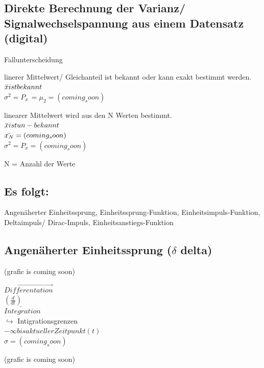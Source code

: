 \documentclass[a4paper]{article}
\begin{document}
\subsection*{Direkte Berechnung der Varianz/ Signalwechselspannung aus einem Datensatz (digital)}

\begin{center}
    Fallunterscheidung
\end{center}
\begin{multicols}{2}
    linerer Mittelwert/ Gleichanteil ist bekannt oder kann exakt bestimmt werden. \\
    $\Bar{x} ist bekannt$ \\
    $\sigma^2 = P_{x~} = \mu_2 = (coming_soon)$
    
    \columnbreak
    linearer Mittelwert wird aus den N Werten bestimmt. \\
    $\Bar{x} ist un-bekannt$ \\
    $\Bar{x_N} = (coming_soon)$ \\
    $\sigma^2 = P_x = (coming_soon)$
    
\end{multicols}
\begin{center}
    N = Anzahl der Werte
\end{center}

\subsection*{Es folgt:}
Angenäherter Einheitssprung, Einheitssprung-Funktion, Einheitsimpuls-Funktion, Deltaimpuls/ Dirac-Impuls, Einheitsanstiegs-Funktion

\subsection*{Angenäherter Einheitssprung ($\delta$ delta)}
\begin{multicols}{3}
    (grafic is coming soon)

    \columnbreak

    \begin{center}
    $\overrightarrow{Differentation}$ \\
    $(\frac{d}{dt})$ \\
    \vspace{1em}
    $\overleftarrow{Integration}$ \\
    $\hookrightarrow$ Intigrationsgrenzen \\
    $-\infty bis aktueller Zeitpunkt (t)$ \\
    $\sigma = (coming_soon)$
    \end{center}

    \columnbreak
    (grafic is coming soon)
\end{multicols}
\end{document}
